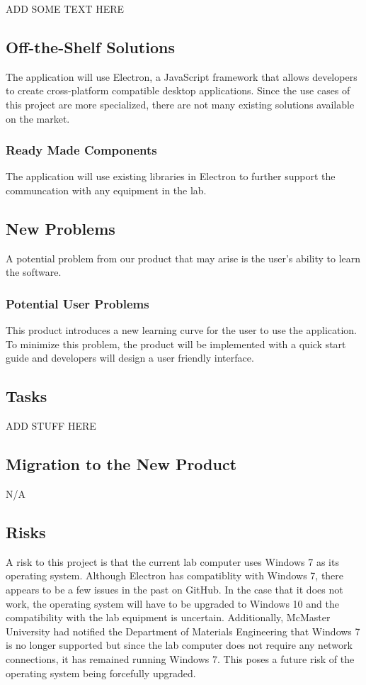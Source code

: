 \documentclass[12pt, titlepage]{article}
\begin{document}
ADD SOME TEXT HERE

\subsection{Off-the-Shelf Solutions}
The application will use Electron, a JavaScript framework that allows developers to create cross-platform compatible desktop applications. 
Since the use cases of this project are more specialized, there are not many existing solutions available on the market.

\subsubsection{Ready Made Components}
The application will use existing libraries in Electron to further support the communcation with any equipment in the lab.

\subsection{New Problems}
 A potential problem from our product that may arise is the user's ability to learn the software.
  \subsubsection{Potential User Problems}
This product introduces a new learning curve for the user to use the application. 
To minimize this problem, the product will be implemented with a quick start guide and developers will design a user friendly interface.


\subsection{Tasks}
ADD STUFF HERE 

\subsection{Migration to the New Product}
N/A

\subsection{Risks}
A risk to this project is that the current lab computer uses Windows 7 as its operating system. Although Electron has compatiblity with Windows 7, there appears to be a few issues in the past on GitHub. 
In the case that it does not work, the operating system will have to be upgraded to Windows 10 and the compatibility with the lab equipment is uncertain. Additionally, McMaster University had notified the 
Department of Materials Engineering that Windows 7 is no longer supported but since the lab computer does not require any network connections, it has remained running Windows 7. This poses a future risk of 
the operating system being forcefully upgraded.\\
\end{document}
